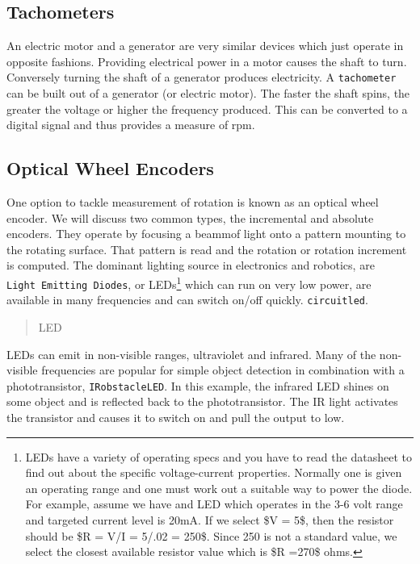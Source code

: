\hypertarget{tachometers}{%
\subsection{Tachometers}\label{tachometers}}

An electric motor and a generator are very similar devices which just
operate in opposite fashions. Providing electrical power in a motor
causes the shaft to turn. Conversely turning the shaft of a generator
produces electricity. A \texttt{tachometer} can be built out of a
generator (or electric motor). The faster the shaft spins, the greater
the voltage or higher the frequency produced. This can be converted to a
digital signal and thus provides a measure of rpm.

\hypertarget{optical-wheel-encoders}{%
\subsection{Optical Wheel Encoders}\label{optical-wheel-encoders}}

One option to tackle measurement of rotation is known as an optical
wheel encoder. We will discuss two common types, the incremental and
absolute encoders. They operate by focusing a beammof light onto a
pattern mounting to the rotating surface. That pattern is read and the
rotation or rotation increment is computed. The dominant lighting source
in electronics and robotics, are \texttt{Light\ Emitting\ Diodes}, or
LEDs\footnote{LEDs have a variety of operating specs and you have to
  read the datasheet to find out about the specific voltage-current
  properties. Normally one is given an operating range and one must work
  out a suitable way to power the diode. For example, assume we have and
  LED which operates in the 3-6 volt range and targeted current level is
  20mA. If we select \$V = 5\$, then the resistor should be \$R = V/I =
  5/.02 = 250\$. Since 250 is not a standard value, we select the
  closest available resistor value which is \$R =270\$ ohms.} which can
run on very low power, are available in many frequencies and can switch
on/off quickly. \texttt{circuitled}.

\begin{quote}
LED
\end{quote}

LEDs can emit in non-visible ranges, ultraviolet and infrared. Many of
the non-visible frequencies are popular for simple object detection in
combination with a phototransistor, \texttt{IRobstacleLED}. In this
example, the infrared LED shines on some object and is reflected back to
the phototransistor. The IR light activates the transistor and causes it
to switch on and pull the output to low.

